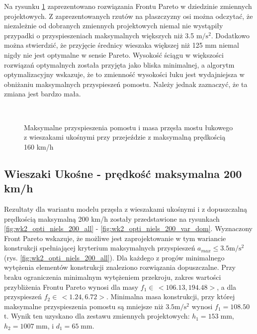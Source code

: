 Na rysunku \ref{fig:wk2_opti_niels_160_var_dom} zaprezentowano rozwiązania Frontu Pareto w dziedzinie zmiennych projektowych. Z zaprezentowanych rzutów na płaszczyzny osi można odczytać, że niezależnie od dobranych zmiennych projektowych niemal nie wystąpiły przypadki o przyspieszeniach maksymalnych większych niż 3.5 $\mathrm{m/s^2}$. Dodatkowo można stwierdzić, że przyjęcie średnicy wieszaka większej niż 125 mm niemal nigdy nie jest optymalne w sensie Pareto. Wysokość ściągu w większości rozwiązań optymalnych została przyjęta jako bliska minimalnej, a algorytm optymalizacyjny wskazuje, że to zmienność wysokości łuku jest wydajniejsza w obniżaniu maksymalnych przyspieszeń pomostu. Należy jednak zaznaczyć, że ta zmiana jest bardzo mała. 

\begin{figure}[hbt!]
	\centering
	\\
	\captionsetup{justification=centering}
	\caption{Maksymalne przyspieszenia pomostu i masa przęsła mostu łukowego z wieszakami ukośnymi przy przejeździe z maksymalną prędkością 160 km/h}
	\label{fig:wk2_opti_niels_160_var_dom}
\end{figure}









\pagebreak[4]
\subsection{Wieszaki Ukośne - prędkość maksymalna 200 km/h}

Rezultaty dla wariantu modelu przęsła z wieszakami ukośnymi i z dopuszczalną prędkością maksymalną 200 km/h zostały przedstawione na rysunkach \ref{fig:wk2_opti_niels_200_all} - \ref{fig:wk2_opti_niels_200_var_dom}. Wyznaczony Front Pareto wskazuje, że możliwe jest zaprojektowanie w tym wariancie konstrukcji spełniającej kryterium maksymalnych przyspieszeń $a_{max}\le 3.5 \mathrm{m/s^2}$ (rys. \ref{fig:wk2_opti_niels_200_all}). Dla każdego z progów minimalnego wytężenia elementów konstrukcji znaleziono rozwiązania dopuszczalne. Przy braku ograniczenia minimalnym wytężeniem przekroju, zakres wartości przybliżenia Frontu Pareto wynosi dla masy $f_1 \in\,<106.13,194.48>$, a dla przyspieszeń $f_2 \in\,<1.24,6.72>$. Minimalna masa konstrukcji, przy której maksymalne przyspieszenia pomostu są mniejsze niż $3.5 \mathrm{m/s^2}$ wynosi $f_1 = 108.50$ t. Wynik ten uzyskano dla zestawu zmiennych projektowych: $h_1 = 153\;\mathrm{mm}$, $h_2 = 1007\;\mathrm{mm}$, i $d_1 = 65\;\mathrm{mm}$.


